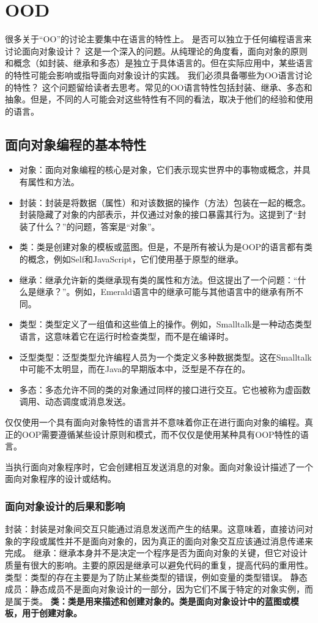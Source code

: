 \chapter{OOD}

很多关于“OO”的讨论主要集中在语言的特性上。
是否可以独立于任何编程语言来讨论面向对象设计？
这是一个深入的问题。从纯理论的角度看，面向对象的原则和概念（如封装、继承和多态）是独立于具体语言的。但在实际应用中，某些语言的特性可能会影响或指导面向对象设计的实践。
我们必须具备哪些为OO语言讨论的特性？
这个问题留给读者去思考。常见的OO语言特性包括封装、继承、多态和抽象。但是，不同的人可能会对这些特性有不同的看法，取决于他们的经验和使用的语言。


\section{面向对象编程的基本特性}
\begin{itemize}
    \item 对象：面向对象编程的核心是对象，它们表示现实世界中的事物或概念，并具有属性和方法。
    \item 封装：封装是将数据（属性）和对该数据的操作（方法）包装在一起的概念。封装隐藏了对象的内部表示，并仅通过对象的接口暴露其行为。这提到了“封装了什么？”的问题，答案是“对象”。
    \item 类：类是创建对象的模板或蓝图。但是，不是所有被认为是OOP的语言都有类的概念，例如Self和JavaScript，它们使用基于原型的继承。
    \item 继承：继承允许新的类继承现有类的属性和方法。但这提出了一个问题：“什么是继承？”。例如，Emerald语言中的继承可能与其他语言中的继承有所不同。
    \item 类型：类型定义了一组值和这些值上的操作。例如，Smalltalk是一种动态类型语言，这意味着它在运行时检查类型，而不是在编译时。
    \item 泛型类型：泛型类型允许编程人员为一个类定义多种数据类型。这在Smalltalk中可能不太明显，而在Java的早期版本中，泛型是不存在的。
    \item 多态：多态允许不同的类的对象通过同样的接口进行交互。它也被称为虚函数调用、动态调度或消息发送。
\end{itemize}

仅仅使用一个具有面向对象特性的语言并不意味着你正在进行面向对象的编程。真正的OOP需要遵循某些设计原则和模式，而不仅仅是使用某种具有OOP特性的语言。

当执行面向对象程序时，它会创建相互发送消息的对象。面向对象设计描述了一个面向对象程序的设计或结构。

\subsection{面向对象设计的后果和影响}
封装：封装是对象间交互只能通过消息发送而产生的结果。这意味着，直接访问对象的字段或属性并不是面向对象的，因为真正的面向对象交互应该通过消息传递来完成。
继承：继承本身并不是决定一个程序是否为面向对象的关键，但它对设计质量有很大的影响。主要的原因是继承可以避免代码的重复，提高代码的重用性。
类型：类型的存在主要是为了防止某些类型的错误，例如变量的类型错误。
静态成员：静态成员不是面向对象设计的一部分，因为它们不属于特定的对象实例，而是属于类。
\textbf{类：类是用来描述和创建对象的。类是面向对象设计中的蓝图或模板，用于创建对象。}

